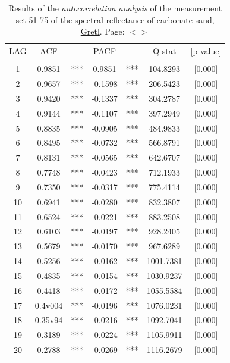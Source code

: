 \documentclass[11pt]{article}
\begin{document}
\begin{appendices}
\begin{table}[htbp]
	\caption{Results of the \textit{autocorrelation analysis} of the measurement set 51-75 of the spectral reflectance of carbonate sand, \href{http://gretl.sourceforge.net/}{Gretl}. Page: $<$\pageref{page-41}$>$}
	\begin{center}
	\begin{tabular}{|c c c c c c c||}
		\hline\hline
		LAG & ACF & & PACF & & Q-stat & [p-value] \\ \\ \hline\hline
		1  & 0.9851 & ***  & 0.9851& ***   & 104.8293 & [0.000]\\ \hline
		    2  & 0.9657  &***  &-0.1598  &   ***  &  206.5423  &[0.000]\\ \hline
		    3  & 0.9420  &***  &-0.1337  &  ***   &  304.2787  &[0.000]\\ \hline
		    4  & 0.9144  &***  &-0.1107  &  ***   &  397.2949  &[0.000]\\ \hline
		    5  & 0.8835  &***  &-0.0905  &  ***   &  484.9833  &[0.000]\\ \hline
		    6  & 0.8495 & ***  &-0.0732  &  ***   &  566.8791  &[0.000]\\ \hline
		    7  & 0.8131 & ***  &-0.0565  &  ***   &  642.6707  &[0.000]\\ \hline
		    8  & 0.7748 & ***  &-0.0423  &  ***   &  712.1933  &[0.000]\\ \hline
		    9  & 0.7350 & ***  &-0.0317  &  ***   &  775.4114  &[0.000]\\ \hline
		   10 &  0.6941&  *** & -0.0280 &  ***   &   832.3807 & [0.000]\\ \hline
		   11 &  0.6524 & *** & -0.0221 &  ***   &   883.2508 & [0.000]\\ \hline
		   12 &  0.6103 & *** & -0.0197 &  ***   &   928.2405 & [0.000]\\ \hline
		   13 &  0.5679 & *** & -0.0170 &  ***   &   967.6289 & [0.000]\\ \hline
		   14 &  0.5256 & *** & -0.0162 &  ***   &  1001.7381&  [0.000]\\ \hline
		   15 &  0.4835 & *** & -0.0154 &  ***   &  1030.9237 & [0.000]\\ \hline
		   16 & 0.4418 & *** & -0.0172  &  ***  &  1055.5584 & [0.000]\\ \hline
		   17  & 0.4v004 & *** & -0.0196 &***     &  1076.0231 & [0.000]\\ \hline
		   18 & 0.35v94 & *** & -0.0216  & ***   &  1092.7041 & [0.000]\\ \hline
		   19 &  0.3189 & *** & -0.0224   & ***  &  1105.9911 & [0.000]\\ \hline
		   20 &  0.2788 & *** & -0.0269   & ***  &  1116.2679 & [0.000]\\ \hline
	\end{tabular}
	\end{center}
	\label{tab:28}
\end{table}
\pagebreak


\end{appendices}
\end{document}
